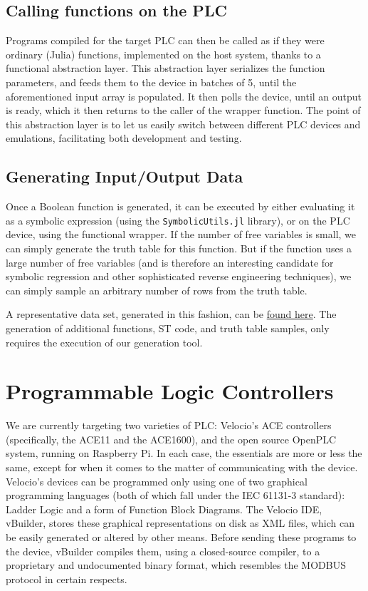 \documentclass[11pt]{article}
\begin{document}
\subsection{Calling functions on the PLC}
\label{sec:orgdb8ac84}

Programs compiled for the target PLC can then be called as if they were ordinary (Julia) functions, implemented on the host system, thanks to a functional abstraction layer. This abstraction layer serializes the function parameters, and feeds them to the device in batches of 5, until the aforementioned input array is populated. It then polls the device, until an output is ready, which it then returns to the caller of the wrapper function. The point of this abstraction layer is to let us easily switch between different PLC devices and emulations, facilitating both development and testing.

\subsection{Generating Input/Output Data}
\label{sec:org038a38d}

Once a Boolean function is generated, it can be executed by either evaluating it as a symbolic expression (using the \texttt{SymbolicUtils.jl} library), or on the PLC device, using the functional wrapper. If the number of free variables is small, we can simply generate the truth table for this function. But if the function uses a large number of free variables (and is therefore an interesting candidate for symbolic regression and other sophisticated reverse engineering techniques), we can simply sample an arbitrary number of rows from the truth table.

A representative data set, generated in this fashion, can be \href{https://github.com/oblivia-simplex/refusr/blob/main/Refusr/milestone2\_samples.tgz}{found here}. The generation of additional functions, ST code, and truth table samples, only requires the execution of our generation tool.

\section{Programmable Logic Controllers}
\label{sec:orgccc3142}

We are currently targeting two varieties of PLC: Velocio's ACE controllers (specifically, the ACE11 and the ACE1600), and the open source OpenPLC system, running on Raspberry Pi. In each case, the essentials are more or less the same, except for when it comes to the matter of communicating with the device. Velocio's devices can be programmed only using one of two graphical programming languages (both of which fall under the IEC 61131-3 standard): Ladder Logic and a form of Function Block Diagrams. The Velocio IDE, vBuilder, stores these graphical representations on disk as XML files, which can be easily generated or altered by other means. Before sending these programs to the device, vBuilder compiles them, using a closed-source compiler, to a proprietary and undocumented binary format, which resembles the MODBUS protocol in certain respects. 
\end{document}

